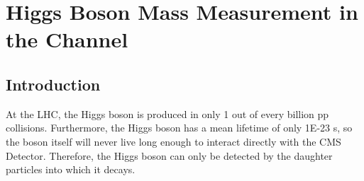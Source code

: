 \chapter{Higgs Boson Mass Measurement in the \hzzfourl Channel}
\label{ch:higgs_mass}

\section{Introduction}
\label{sec:higgs_intro}

At the LHC, the Higgs boson is produced in only 1 out of every billion pp collisions.
Furthermore, the Higgs boson has a mean lifetime of only 1E-23 s,
so the boson itself will never live long enough to interact directly with the CMS Detector.
Therefore, the Higgs boson can only be detected by the daughter particles into which it decays.

